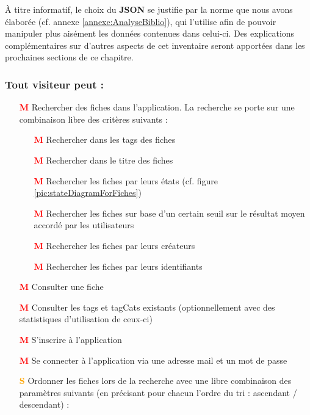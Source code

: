 À titre informatif, le choix du \textbf{JSON} se justifie par la norme que nous avons élaborée (cf. annexe \ref{annexe:AnalyseBiblio}), qui l'utilise afin de pouvoir manipuler plus aisément les données contenues dans celui-ci.
Des explications complémentaires sur d'autres aspects de cet inventaire seront apportées dans les prochaines sections de ce chapitre.

\subsubsection*{Tout visiteur peut : }

\begin{itemize}
    \item[\textcolor{red}{\textbf{M}}] Rechercher des \glspl{fiche} dans l'application. La recherche se porte sur une combinaison libre des critères suivants : 
    \begin{itemize}
        \item[\textcolor{red}{\textbf{M}}] Rechercher dans les \glspl{tag} des \glspl{fiche}
        \item[\textcolor{red}{\textbf{M}}] Rechercher dans le titre des \glspl{fiche}
        \item[\textcolor{red}{\textbf{M}}] Rechercher les \glspl{fiche} par leurs états (cf. figure \ref{pic:stateDiagramForFiches})
        \item[\textcolor{red}{\textbf{M}}] Rechercher les \glspl{fiche} sur base d'un certain seuil sur le résultat moyen accordé par les utilisateurs
        \item[\textcolor{red}{\textbf{M}}] Rechercher les \glspl{fiche} par leurs créateurs
        \item[\textcolor{red}{\textbf{M}}] Rechercher les \glspl{fiche} par leurs identifiants
    \end{itemize}
        \item[\textcolor{red}{\textbf{M}}] Consulter une \gls{fiche}
    \item[\textcolor{red}{\textbf{M}}] Consulter les \glspl{tag} et \glspl{tagCat} existants (optionnellement avec des statistiques d'utilisation de ceux-ci)
    \item[\textcolor{red}{\textbf{M}}] S'inscrire à l'application
    \item[\textcolor{red}{\textbf{M}}] Se connecter à l'application via une adresse mail et un mot de passe
    \item[\textcolor{orange}{\textbf{S}}] Ordonner les \glspl{fiche} lors de la recherche avec une libre combinaison des paramètres suivants (en précisant pour chacun l'ordre du tri : ascendant / descendant) :

\end{itemize}
